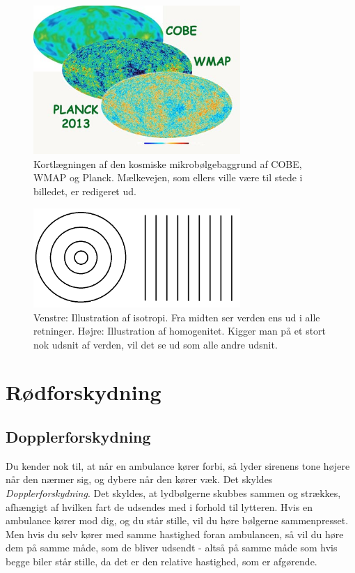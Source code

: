 \begin{figure}[h]
	\centering
	\includegraphics[width=0.7\textwidth]{Astrofysik/Astrofig/CMB.jpg}
	\caption{Kortlægningen af den kosmiske mikrobølgebaggrund af COBE, WMAP og
		Planck. Mælkevejen, som ellers ville være til stede i billedet, er redigeret ud. }
	\label{CMB}
\end{figure}

\begin{figure}[h]
	\centering
	\includegraphics[width=0.7\textwidth]{Astrofysik/Astrofig/isohomo.png}
	\caption{Venstre: Illustration af isotropi. Fra midten ser verden ens ud i alle retninger. Højre: Illustration af homogenitet. Kigger man på et stort nok udsnit af verden, vil det se ud som alle andre udsnit.}
	\label{isohomo}
\end{figure}

\section{Rødforskydning}
\label{12}
\subsection{Dopplerforskydning}
Du kender nok til, at når en ambulance kører forbi, så lyder sirenens tone højere når den nærmer sig, og dybere når den kører væk. Det skyldes \emph{Dopplerforskydning}. %
Det skyldes, at lydbølgerne skubbes sammen og strækkes, afhængigt af hvilken fart de udsendes med i forhold til lytteren. Hvis en ambulance kører mod dig, og du står stille, vil du høre bølgerne sammenpresset. Men hvis du selv kører med samme hastighed foran ambulancen, så vil du høre dem på samme måde, som de bliver udsendt - altså på samme måde som hvis begge biler står stille, da det er den relative hastighed, som er afgørende.

